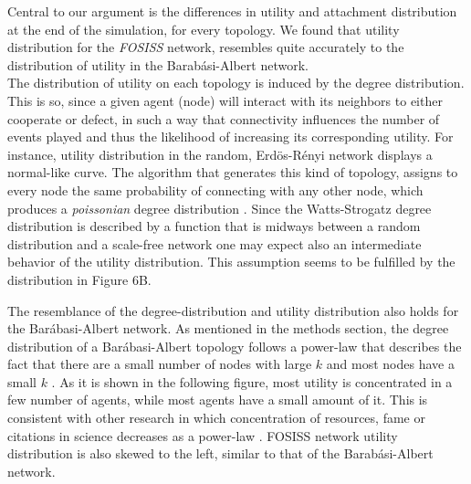 \documentclass[11pt]{article}
\begin{document}
\FloatBarrier

Central to our argument is the differences in utility and attachment
distribution at the end of the simulation, for every topology. We 
found that utility distribution for the \textit{FOSISS} network, resembles quite
accurately to the distribution of utility in the Barab\'asi-Albert
network.\\ 


The distribution of utility on each topology is induced by the degree
distribution. This is so, since a given agent (node) will interact with its
neighbors to either cooperate or defect, in such a way that connectivity
influences the number of events played and thus the likelihood of increasing its
corresponding utility. For instance, utility distribution in the random,
Erd\"{o}s-R\'enyi network displays a normal-like curve. The algorithm that
generates this kind of topology, assigns to every node the same probability of
connecting with any other node, which produces a \textit{poissonian} degree
distribution \cite{Erdos1959}. Since the Watts-Strogatz degree distribution is
described by a function that is midways between a random distribution and a
scale-free network \cite{Barrat2000} one may expect also  an intermediate
behavior of the utility distribution. This assumption seems to be fulfilled by
the distribution in Figure 6B. 

The resemblance of the degree-distribution and utility distribution also holds
for the Bar\'abasi-Albert network. As mentioned in the methods section, the
degree distribution of a Bar\'abasi-Albert topology follows a power-law that
describes the fact that there are a small number of nodes with large $k$ and most
nodes have a small $k$ \cite{Barabasi1999}. As it is shown in the following
figure, most utility is concentrated in a few number of agents, while most
agents have a small amount of it. This is consistent with other research in
which concentration of resources, fame or citations in science decreases as a
power-law \cite{Simon1955,Price1965,Merton1968}. FOSISS network utility
distribution is also skewed to the left, similar to that of the
Barab\'asi-Albert network. \\ 
\end{document}

